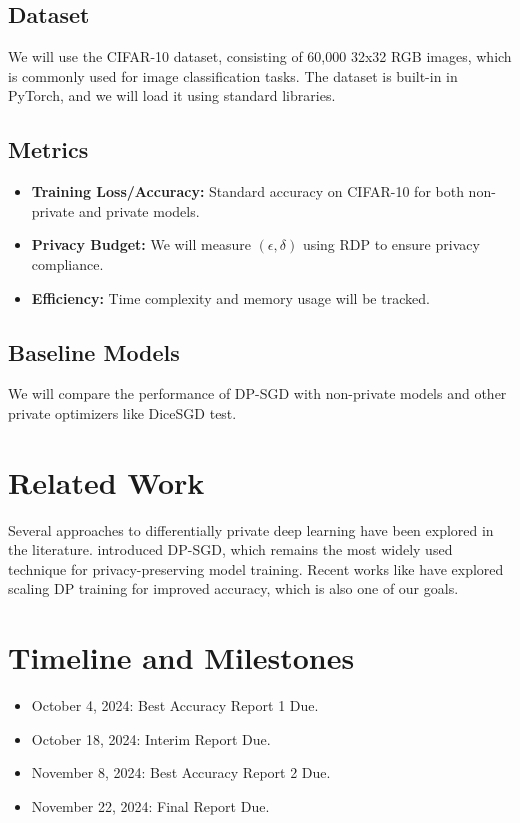 \documentclass{article}
\begin{document}
\subsection{Dataset}
We will use the CIFAR-10 dataset, consisting of 60,000 32x32 RGB images, which is commonly used for image classification tasks. The dataset is built-in in PyTorch, and we will load it using standard libraries.

\subsection{Metrics}
\begin{itemize}
    \item \textbf{Training Loss/Accuracy:} Standard accuracy on CIFAR-10 for both non-private and private models.
    \item \textbf{Privacy Budget:} We will measure $(\epsilon, \delta)$ using RDP to ensure privacy compliance.
    \item \textbf{Efficiency:} Time complexity and memory usage will be tracked.
\end{itemize}

\subsection{Baseline Models}
We will compare the performance of DP-SGD with non-private models and other private optimizers like DiceSGD test. 

\section{Related Work}
Several approaches to differentially private deep learning have been explored in the literature. \citet{abadi2016deep} introduced DP-SGD, which remains the most widely used technique for privacy-preserving model training. Recent works like \citet{de2022unlocking} have explored scaling DP training for improved accuracy, which is also one of our goals.

\section{Timeline and Milestones}
\begin{itemize}
    \item October 4, 2024: Best Accuracy Report 1 Due.
    \item October 18, 2024: Interim Report Due.
    \item November 8, 2024: Best Accuracy Report 2 Due.
    \item November 22, 2024: Final Report Due.
\end{itemize}
\end{document}
